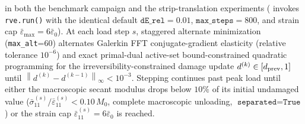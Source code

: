 \documentclass[preprint,11pt,a4paper]{elsarticle}
\newcommand{\norm}[1]{\left\lVert #1\right\rVert}
\begin{document}
in both the benchmark campaign and the strip-translation experiments ( invokes \texttt{rve.run()} with the identical default $\texttt{dE\_rel}=0.01$, $\texttt{max\_steps}=800$, and strain cap $\bar\varepsilon_{\max}=6\bar\varepsilon_0$). At each load step $s$, staggered alternate minimization (\texttt{max\_alt}=60) alternates Galerkin FFT conjugate-gradient elasticity (relative tolerance $10^{-6}$) and exact primal-dual active-set bound-constrained quadratic programming for the irreversibility-constrained damage update $d^{(k)}\in[d_{\rm prev},1]$ until $\norm{d^{(k)}-d^{(k-1)}}_\infty < 10^{-3}$. Stepping continues past peak load until either the macroscopic secant modulus drops below $10\%$ of its initial undamaged value ($\bar\sigma_{11}^{(s)}/\bar\varepsilon_{11}^{(s)} < 0.10\,M_0$, complete macroscopic unloading, $\texttt{separated}=\texttt{True}$) or the strain cap $\bar\varepsilon_{11}^{(s)}=6\bar\varepsilon_0$ is reached.
\end{document}

